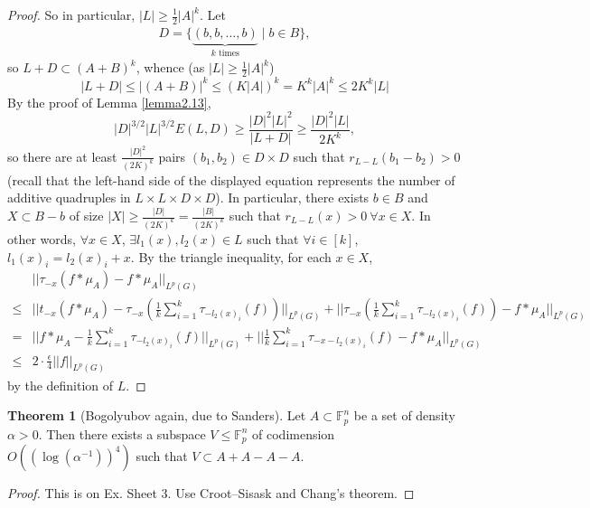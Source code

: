 \documentclass{article}
\theoremstyle{definition}
\newtheorem{theorem}{Theorem}[section]
\begin{document}
\begin{proof}
    So in particular, $\left|L\right|\ge \frac{1}{2}\left|A\right|^k$. Let
    \begin{align*}
        D = \{\underbrace{(b,b,\ldots,b)}_{k \text{ times}} \mid b \in B\},
    \end{align*}
    so $L + D \subset (A+B)^k$, whence (as $\left|L\right|\ge \frac{1}{2}\left|A\right|^k$) $$\left|L+D\right|\le \left|(A+B)\right|^k \le (K\left|A\right|)^k = K^k \left|A\right|^k \le 2K^k \left|L\right|$$
    By the proof of Lemma \ref{lemma2.13}, 
    $$\left|D\right|^{3/2}\left|L\right|^{3/2}E(L,D) \ge \frac{\left|D\right|^2\left|L\right|^2}{\left|L+D\right|}\ge \frac{\left|D\right|^2\left|L\right|}{2K^k},$$
    so there are at least $\frac{\left|D\right|^2}{(2K)^k}$ pairs $(b_1,b_2) \in D \times D$ such that $r_{L-L}(b_1-b_2) > 0$ (recall that the left-hand side of the displayed equation represents the number of additive
    quadruples in $L \times L \times D \times D$). In particular, there exists $b \in B$ and $X \subset B-b$ of size $\left|X\right| \ge \frac{\left|D\right|}{(2K)^k} = \frac{\left|B\right|}{(2K)^k}$ such that $r_{L-L}(x) > 0 ~\forall x \in X$. In other words, $\forall x \in X$, $\exists l_1(x),l_2(x) \in L$ such that $\forall i \in [k]$, $l_1(x)_i = l_2(x)_i + x$. By the triangle inequality, for each $x \in X$, 
    \begin{align*}
        &||\tau_{-x}(f * \mu_A) - f * \mu_A||_{L^p(G)}\\
        \le & ||t_{-x}(f*\mu_A)-\tau_{-x}\left(\frac{1}{k}\sum_{i=1}^{k}\tau_{-l_2(x)_i}(f)\right)||_{L^p(G)} + ||\tau_{-x}\left(\frac{1}{k}\sum_{i=1}^{k}\tau_{-l_2(x)_i}(f)\right)-f* \mu_A||_{L^p(G)}\\
        =& ||f * \mu_A - \frac{1}{k}\sum_{i=1}^{k} \tau_{-l_2(x)_i}(f)||_{L^p(G)} + ||\frac{1}{k}\sum_{i=1}^{k} \tau_{-x-l_2(x)_i}(f)-f*\mu_A||_{L^p(G)}\\
        \le& 2 \cdot \frac{\epsilon}{4} ||f||_{L^p(G)}
    \end{align*}
    by the definition of $L$.
\end{proof}
\begin{theorem}[Bogolyubov again, due to Sanders]\label{theorem3.9}
    Let $A \subset \mathbb{F}_p^n$ be a set of density $\alpha>0$. Then there exists a subspace $V \le \mathbb{F}_p^n$ of codimension $O((\log(\alpha^{-1}))^4)$ such that $V \subset A+A-A-A$.
\end{theorem}
\begin{proof}
    This is on Ex. Sheet 3. Use Croot--Sisask and Chang's theorem.
\end{proof}
\end{document}
